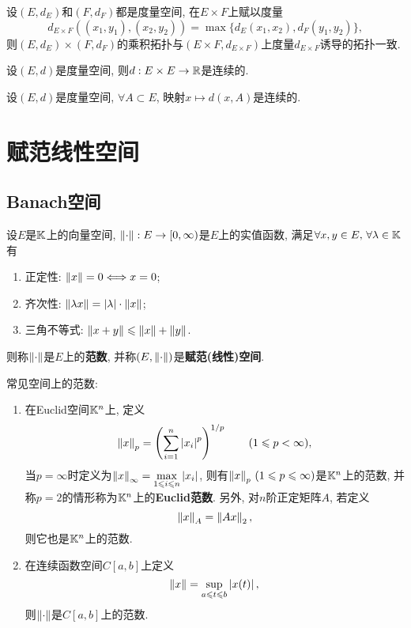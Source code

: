 	\begin{Remark}
	设$ (E,d_E) $和$ (F,d_F) $都是度量空间, 在$ E\times F $上赋以度量
	\[
	d_{E\times F}\left((x_1,y_1),(x_2,y_2)\right)=\max\{ d_E(x_1,x_2), d_F(y_1,y_2) \},
	\]
	则$ (E,d_E) \times (F,d_F) $的乘积拓扑与$ (E\times F, d_{E\times F}) $上度量$ d_{E\times F} $诱导的拓扑一致.
	\end{Remark}
	
	\begin{Proposition}
	设$ (E,d) $是度量空间, 则$ d : E\times E\to\mathbb{R} $是连续的.
	\end{Proposition}
	\begin{Corollary}
	设$ (E,d) $是度量空间, $ \forall A\subset E $, 映射$ x\mapsto d(x,A) $是连续的.
    \end{Corollary}
	
\section{赋范线性空间}
	
	\subsection{Banach空间}
	
	\begin{Definition}[赋范空间]\label{def:赋范空间}
	设$ E $是$ \mathbb{K} $上的向量空间, $ \left\| \cdot \right\| : E\to[0,\infty) $是$ E $上的实值函数, 满足$ \forall x,y\in E,\,\forall\lambda\in\mathbb{K} $有
	
	\begin{enumerate}[(1)]
	\item 正定性: $ \left\| x \right\|=0\Longleftrightarrow x=0 $;
	
	\item 齐次性: $ \left\| \lambda x \right\|=\left| \lambda \right| \cdot\left\| x \right\| $;
	
	\item 三角不等式: $ \left\| x+y \right\|\leqslant\left\| x \right\|+\left\| y \right\| $.
	\end{enumerate} 
	则称$ \left\| \cdot \right\| $是$ E $上的\textbf{范数}, 并称$ (E,\left\| \cdot \right\|) $是\textbf{赋范(线性)空间}.
	\end{Definition}
	
	\begin{Example}
	常见空间上的范数:
	
	\begin{enumerate}[(1)]
	\item 在Euclid空间$ \mathbb{K}^n $上, 定义
		\[
		\left\| x \right\|_p=\left(\sum_{i=1}^n\left| x_i \right| ^p\right)^{1/p}\qquad(1\leqslant p<\infty),
		\]
		当$ p=\infty $时定义为$ \left\| x \right\|_\infty=\max\limits_{1\leqslant i\leqslant n}\left| x_i \right|  $, 则有$ \left\| x \right\|_p\,(1\leqslant p\leqslant\infty) $是$ \mathbb{K}^n $上的范数, 并称$ p=2 $的情形称为$ \mathbb{K}^n $上的\textbf{Euclid范数}. 另外, 对$ n $阶正定矩阵$ A $, 若定义
		\[
		\left\| x \right\|_A=\left\| Ax \right\|_2,
		\]
		则它也是$ \mathbb{K}^n $上的范数.
	
	\item 在连续函数空间$ C[a,b] $上定义
	\[
	\left\| x \right\|=\sup_{a\leqslant t\leqslant b}\left| x(t) \right| ,
	\]
	则$ \left\| \cdot \right\| $是$ C[a,b] $上的范数.
	\end{enumerate}
	
	\end{Example}
	
